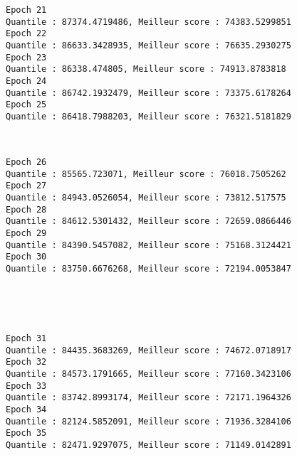 \documentclass[11pt]{article}
\begin{document}
    \begin{Verbatim}[commandchars=\\\{\}]
Epoch 21
Quantile : 87374.4719486, Meilleur score : 74383.5299851
Epoch 22
Quantile : 86633.3428935, Meilleur score : 76635.2930275
Epoch 23
Quantile : 86338.474805, Meilleur score : 74913.8783818
Epoch 24
Quantile : 86742.1932479, Meilleur score : 73375.6178264
Epoch 25
Quantile : 86418.7988203, Meilleur score : 76321.5181829

    \end{Verbatim}

    \begin{center}
    \end{center}
    { \hspace*{\fill} \\}
    
    \begin{Verbatim}[commandchars=\\\{\}]
Epoch 26
Quantile : 85565.723071, Meilleur score : 76018.7505262
Epoch 27
Quantile : 84943.0526054, Meilleur score : 73812.517575
Epoch 28
Quantile : 84612.5301432, Meilleur score : 72659.0866446
Epoch 29
Quantile : 84390.5457082, Meilleur score : 75168.3124421
Epoch 30
Quantile : 83750.6676268, Meilleur score : 72194.0053847

    \end{Verbatim}

    \begin{center}
    \end{center}
    { \hspace*{\fill} \\}
    
    \begin{center}
    \end{center}
    { \hspace*{\fill} \\}
    
    \begin{Verbatim}[commandchars=\\\{\}]
Epoch 31
Quantile : 84435.3683269, Meilleur score : 74672.0718917
Epoch 32
Quantile : 84573.1791665, Meilleur score : 77160.3423106
Epoch 33
Quantile : 83742.8993174, Meilleur score : 72171.1964326
Epoch 34
Quantile : 82124.5852091, Meilleur score : 71936.3284106
Epoch 35
Quantile : 82471.9297075, Meilleur score : 71149.0142891

    \end{Verbatim}
\end{document}
